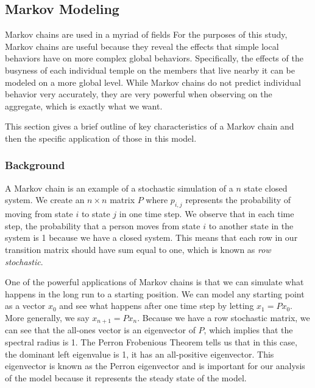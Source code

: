 \documentclass[twoside,twocolumn]{article}
\begin{document}
\subsection{Markov Modeling}

Markov chains are used in a myriad of fields
 For the purposes of this study, Markov chains are useful because they reveal the effects that simple local behaviors have on more complex global behaviors.
Specifically, the effects of the busyness of each individual temple on the members that live nearby it can be modeled on a more global level.
While Markov chains do not predict individual behavior very accurately, they are very powerful when observing on the aggregate, which is exactly what we want.

This section gives a brief outline of key characteristics of a Markov chain and then the specific application of those in this model.

\subsubsection{Background}

A Markov chain is an example of a stochastic simulation of a $n$ state closed system. %
We create an $n\times n$ matrix $P$ where $p_{i,j}$ represents the probability of moving from state $i$ to state $j$ in one time step.
We observe that in each time step, the probability that a person moves from state $i$ to another state in the system is 1 because we have a closed system.
This means that each row in our transition matrix should have sum equal to one, which is known as {\em row stochastic}.

One of the powerful applications of Markov chains is that we can simulate what happens in the long run to a starting position. %
We can model any starting point as a vector $x_0$ and see what happens after one time step by letting $x_1 = P x_0$.
More generally, we say $x_{n + 1} = P x_n$.
Because we have a row stochastic matrix, we can see that the all-ones vector is an eigenvector of $P$, which implies that the spectral radius is 1. %
The Perron Frobenious Theorem tells us that in this case, the dominant left eigenvalue is 1, it has an all-positive eigenvector.
This eigenvector is known as the Perron eigenvector and is important for our analysis of the model because it represents the steady state of the model.
\end{document}
